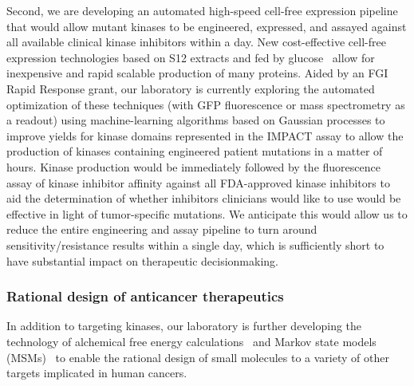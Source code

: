 \documentclass[10pt]{article}
\begin{document}
Second, we are developing an automated high-speed cell-free expression pipeline that would allow mutant kinases to be engineered, expressed, and assayed against all available clinical kinase inhibitors within a day.
New cost-effective cell-free expression technologies based on S12 extracts and fed by glucose~\cite{kim_simple_2006,calhoun_economical_2008} allow for inexpensive and rapid scalable production of many proteins.
Aided by an FGI Rapid Response grant, our laboratory is currently exploring the automated optimization of these techniques (with GFP fluorescence or mass spectrometry as a readout) using machine-learning algorithms based on Gaussian processes to improve yields for kinase domains represented in the IMPACT assay to allow the production of kinases containing engineered patient mutations in a matter of hours.
Kinase production would be immediately followed by the fluorescence assay of kinase inhibitor affinity against all FDA-approved kinase inhibitors to aid the determination of whether inhibitors clinicians would like to use would be effective in light of tumor-specific mutations.
We anticipate this would allow us to reduce the entire engineering and assay pipeline to turn around sensitivity/resistance results within a single day, which is sufficiently short to have substantial impact on therapeutic decisionmaking.

\vspace{-0.3cm}
\subsubsection*{Rational design of anticancer therapeutics}
\vspace{-0.3cm}

In addition to targeting kinases, our laboratory is further developing the technology of alchemical free energy calculations~\cite{chodera:curr-opin-struct-biol:2011:drug-discovery} and Markov state models (MSMs)~\cite{chodera:2006:mms:long-time-dynamics,chodera:jcp:2007,noe:jcp:2011:msm-review} to enable the rational design of small molecules to a variety of other targets implicated in human cancers.
\end{document}
